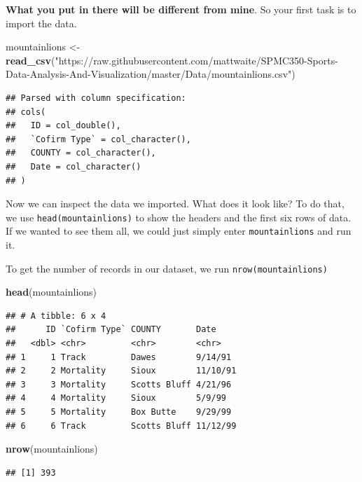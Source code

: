\documentclass[]{book}
\newenvironment{Shaded}{\begin{snugshade}}{\end{snugshade}}
\newcommand{\KeywordTok}[1]{\textcolor[rgb]{0.13,0.29,0.53}{\textbf{#1}}}
\newcommand{\StringTok}[1]{\textcolor[rgb]{0.31,0.60,0.02}{#1}}
\newcommand{\NormalTok}[1]{#1}
\begin{document}
\textbf{What you put in there will be different from mine}. So your
first task is to import the data.

\begin{Shaded}
\begin{Highlighting}[]
\NormalTok{mountainlions <-}\StringTok{ }\KeywordTok{read_csv}\NormalTok{(}\StringTok{"https://raw.githubusercontent.com/mattwaite/SPMC350-Sports-Data-Analysis-And-Visualization/master/Data/mountainlions.csv"}\NormalTok{)}
\end{Highlighting}
\end{Shaded}

\begin{verbatim}
## Parsed with column specification:
## cols(
##   ID = col_double(),
##   `Cofirm Type` = col_character(),
##   COUNTY = col_character(),
##   Date = col_character()
## )
\end{verbatim}

Now we can inspect the data we imported. What does it look like? To do
that, we use \texttt{head(mountainlions)} to show the headers and the
first six rows of data. If we wanted to see them all, we could just
simply enter \texttt{mountainlions} and run it.

To get the number of records in our dataset, we run
\texttt{nrow(mountainlions)}

\begin{Shaded}
\begin{Highlighting}[]
\KeywordTok{head}\NormalTok{(mountainlions)}
\end{Highlighting}
\end{Shaded}

\begin{verbatim}
## # A tibble: 6 x 4
##      ID `Cofirm Type` COUNTY       Date    
##   <dbl> <chr>         <chr>        <chr>   
## 1     1 Track         Dawes        9/14/91 
## 2     2 Mortality     Sioux        11/10/91
## 3     3 Mortality     Scotts Bluff 4/21/96 
## 4     4 Mortality     Sioux        5/9/99  
## 5     5 Mortality     Box Butte    9/29/99 
## 6     6 Track         Scotts Bluff 11/12/99
\end{verbatim}

\begin{Shaded}
\begin{Highlighting}[]
\KeywordTok{nrow}\NormalTok{(mountainlions)}
\end{Highlighting}
\end{Shaded}

\begin{verbatim}
## [1] 393
\end{verbatim}
\end{document}
